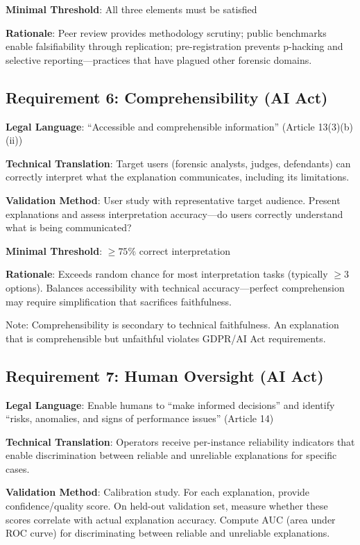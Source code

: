 \textbf{Minimal Threshold}: All three elements must be satisfied

\textbf{Rationale}: Peer review provides methodology scrutiny; public benchmarks enable falsifiability through replication; pre-registration prevents p-hacking and selective reporting—practices that have plagued other forensic domains.

\subsection{Requirement 6: Comprehensibility (AI Act)}

\textbf{Legal Language}: ``Accessible and comprehensible information'' (Article 13(3)(b)(ii))

\textbf{Technical Translation}: Target users (forensic analysts, judges, defendants) can correctly interpret what the explanation communicates, including its limitations.

\textbf{Validation Method}: User study with representative target audience. Present explanations and assess interpretation accuracy—do users correctly understand what is being communicated?

\textbf{Minimal Threshold}: $\geq 75\%$ correct interpretation

\textbf{Rationale}: Exceeds random chance for most interpretation tasks (typically $\geq 3$ options). Balances accessibility with technical accuracy—perfect comprehension may require simplification that sacrifices faithfulness.

Note: Comprehensibility is secondary to technical faithfulness. An explanation that is comprehensible but unfaithful violates GDPR/AI Act requirements.

\subsection{Requirement 7: Human Oversight (AI Act)}

\textbf{Legal Language}: Enable humans to ``make informed decisions'' and identify ``risks, anomalies, and signs of performance issues'' (Article 14)

\textbf{Technical Translation}: Operators receive per-instance reliability indicators that enable discrimination between reliable and unreliable explanations for specific cases.

\textbf{Validation Method}: Calibration study. For each explanation, provide confidence/quality score. On held-out validation set, measure whether these scores correlate with actual explanation accuracy. Compute AUC (area under ROC curve) for discriminating between reliable and unreliable explanations.

